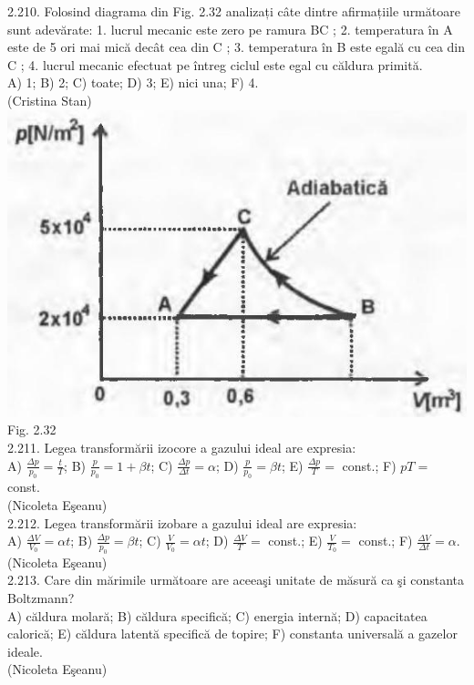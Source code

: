 2.210. Folosind diagrama din Fig. 2.32 analizați câte dintre afirmațiile următoare sunt adevărate: 1. lucrul mecanic este zero pe ramura BC ; 2. temperatura în A este de 5 ori mai mică decât cea din C ; 3. temperatura în B este egală cu cea din C ; 4. lucrul mecanic efectuat pe întreg ciclul este egal cu căldura primită.\\ A) 1; B) 2; C) toate; D) 3; E) nici una; F) 4.\\ (Cristina Stan)\\ \includegraphics[width=0.4\linewidth]{images/2025_07_01_5b3ff9fa0d508c8e9f17g-121(1)} Fig. 2.32\\

2.211. Legea transformării izocore a gazului ideal are expresia:\\ A) $\frac{\Delta p}{p_{0}}=\frac{t}{T}$; B) $\frac{p}{p_{0}}=1+\beta t$; C) $\frac{\Delta p}{\Delta t}=\alpha$; D) $\frac{p}{p_{0}}=\beta t$; E) $\frac{\Delta p}{T}=$ const.; F) $p T=$ const.\\ (Nicoleta Eşeanu)\\

2.212. Legea transformării izobare a gazului ideal are expresia:\\ A) $\frac{\Delta V}{V_{0}}=\alpha t$; B) $\frac{\Delta p}{p_{0}}=\beta t$; C) $\frac{V}{V_{0}}=\alpha t$; D) $\frac{\Delta V}{T}=$ const.; E) $\frac{V}{T_{0}}=$ const.; F) $\frac{\Delta V}{\Delta t}=\alpha$.\\ (Nicoleta Eşeanu)\\

2.213. Care din mărimile următoare are aceeaşi unitate de măsură ca şi constanta Boltzmann?\\ A) căldura molară; B) căldura specifică; C) energia internă; D) capacitatea calorică; E) căldura latentă specifică de topire; F) constanta universală a gazelor ideale.\\ (Nicoleta Eşeanu)\\

